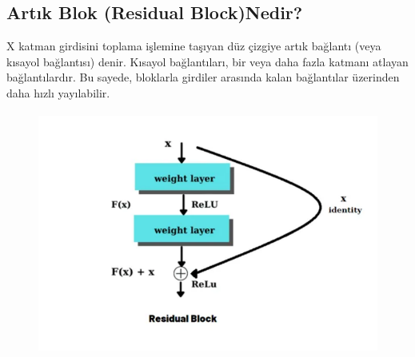 \documentclass[12pt]{article}
\begin{document}
\subsection{Artık Blok (Residual Block)Nedir?}
X katman girdisini toplama işlemine taşıyan düz çizgiye artık bağlantı (veya kısayol bağlantısı) denir. Kısayol bağlantıları, bir veya daha fazla katmanı atlayan bağlantılardır. Bu sayede, bloklarla girdiler arasında kalan bağlantılar üzerinden daha hızlı yayılabilir.\cite{SuhedaCilek}
\begin{figure}[h]
    \centering
    \includegraphics[width=8\textwidth, height=8cm, keepaspectratio]{artıkblok.png}
    \label{fig:enter-label}
\end{figure}
\end{document}
